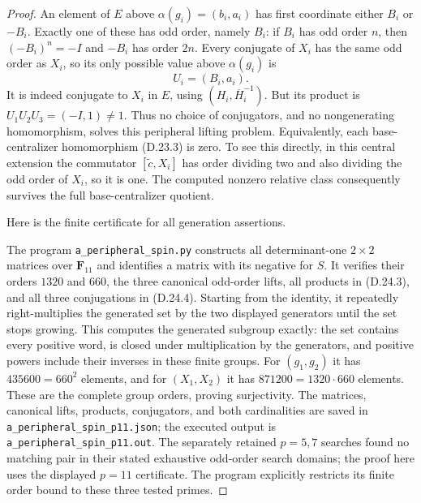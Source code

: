 \begin{proof}
An element of $E$ above $\alpha(g_i)=(b_i,a_i)$ has first
coordinate either $B_i$ or $-B_i$.  Exactly one of these has odd
order, namely $B_i$: if $B_i$ has odd order $n$, then
$(-B_i)^n=-I$ and $-B_i$ has order $2n$.  Every conjugate of
$X_i$ has the same odd order as $X_i$, so its only possible
value above $\alpha(g_i)$ is
\[
 U_i=(B_i,a_i).
 \tag{D.24.6}
\]
It is indeed conjugate to $X_i$ in $E$, using
$(H_i,\overline H_i^{-1})$.  But its product is
$U_1U_2U_3=(-I,1)\ne1$.  Thus no choice of conjugators, and no
nongenerating homomorphism, solves this peripheral lifting problem.
Equivalently, each base-centralizer homomorphism
\textup{(D.23.3)} is zero.  To see this directly, in this central
extension the commutator $[\widetilde c,X_i]$ has order dividing
two and also dividing the odd order of $X_i$, so it is one.
The computed nonzero relative class consequently survives the
full base-centralizer quotient.

Here is the finite certificate for all generation assertions.

The program \texttt{a\_peripheral\_spin.py} constructs all
determinant-one $2\times2$ matrices over $\mathbf F_{11}$ and
identifies a matrix with its negative for $S$.  It verifies their
orders $1320$ and $660$, the three canonical odd-order lifts,
all products in \textup{(D.24.3)}, and all three conjugations in
\textup{(D.24.4)}.  Starting from the identity, it repeatedly
right-multiplies the generated set by the two displayed generators
until the set stops growing.  This computes the generated subgroup
exactly: the set contains every positive word, is closed under
multiplication by the generators, and positive powers include
their inverses in these finite groups.  For $(g_1,g_2)$ it has
$435600=660^2$ elements, and for $(X_1,X_2)$ it has
$871200=1320\cdot660$ elements.  These are the complete group
orders, proving surjectivity.  The matrices, canonical lifts,
products, conjugators, and both cardinalities are saved in
\texttt{a\_peripheral\_spin\_p11.json}; the executed output is
\texttt{a\_peripheral\_spin\_p11.out}.  The separately retained
$p=5,7$ searches found no matching pair in their stated exhaustive
odd-order search domains; the proof here uses the displayed
$p=11$ certificate.  The program explicitly restricts its finite
order bound to these three tested primes.


\end{proof}
